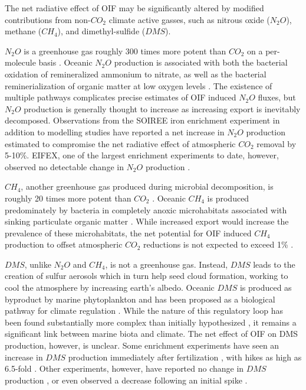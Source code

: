 The net radiative effect of OIF may be significantly altered by modified contributions from non-$CO_2$ climate active gasses, such as nitrous oxide ($N_2O$), methane ($CH_4$), and dimethyl-sulfide ($DMS$).

$N_2O$ is a greenhouse gas roughly 300 times more potent than $CO_2$ on a per-molecule basis \parencite{RamaswamyRadiativeForcingClimate2001}.  Oceanic $N_2O$ production is associated with both the bacterial oxidation of remineralized ammonium to nitrate, as well as the bacterial reminerialization of organic matter at low oxygen levels \parencite{CohenNitrousoxideproduction1979}. The existence of multiple pathways complicates precise estimates of OIF induced $N_2O$ fluxes, but $N_2O$ production is generally thought to increase as increasing export is inevitably decomposed. Observations from the SOIREE iron enrichment experiment \parencite{LawPredictingmonitoringeffects2008} in addition to modelling studies \parencite{JinOffsettingradiativebenefit2003, OschliesSideeffectsaccounting2010} have reported a net increase in $N_2O$ production estimated to compromise the net radiative effect of atmospheric $CO_2$ removal by 5-10\%. EIFEX, one of the largest enrichment experiments to date, however, observed no detectable change in $N_2O$ production \parencite{WalterNitrousoxidemeasurements2005}.

$CH_4$, another greenhouse gas produced during microbial decomposition, is roughly 20 times more potent than $CO_2$ \parencite{RamaswamyRadiativeForcingClimate2001}. Oceanic $CH_4$ is produced predominately by bacteria in completely anoxic microhabitats associated with sinking particulate organic matter \parencite{KarlProductiontransportmethane1994}. While increased export would increase the prevalence of these microhabitats, the net potential for OIF induced $CH_4$ production to offset atmospheric $CO_2$ reductions is not expected to exceed 1\% \parencite{OschliesSideeffectsaccounting2010}. 

$DMS$, unlike $N_2O$ and $CH_4$, is not a greenhouse gas. Instead, $DMS$ leads to the creation of sulfur aerosols which in turn help seed cloud formation, working to cool the atmosphere by increasing earth’s albedo. Oceanic $DMS$ is produced as byproduct by marine phytoplankton and has been proposed as a biological pathway for climate regulation \parencite{CharlsonOceanicphytoplanktonatmospheric1987}. While the nature of this regulatory loop has been found substantially more complex than initially hypothesized \parencite{AyresAtmosphericsulphurcloud1997, Quinncaseclimateregulation2011}, it remains a significant link between marine biota and climate. The net effect of OIF on DMS production, however, is unclear. Some enrichment experiments have seen an increase in $DMS$ production immediately after fertilization \parencite{TurnerIncreaseddimethylsulphide1996,TurnerIroninducedchangesoceanic2004, LissOceanfertilizationiron2005}, with hikes as high as 6.5-fold \parencite{TurnerIroninducedchangesoceanic2004}. Other experiments, however, have reported no change in $DMS$ production \parencite{Takedasituironenrichmentexperiment2005,NagaoResponsesDMSseawater2009}, or even observed a decrease following an initial spike \parencite{LevasseurDMSPDMSdynamics2006}. 

